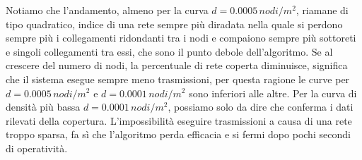 Notiamo che l'andamento, almeno per la curva $d=0.0005\, nodi/m^2$, riamane di tipo quadratico, indice di una rete sempre più diradata nella quale si perdono sempre più i collegamenti ridondanti tra i nodi e compaiono sempre più sottoreti e singoli collegamenti tra essi, che sono il punto debole dell'algoritmo. Se al crescere del numero di nodi, la percentuale di rete coperta diminuisce, significa che il sistema esegue sempre meno trasmissioni, per questa ragione le curve per $d=0.0005\, nodi/m^2$ e $d=0.0001\, nodi/m^2$ sono inferiori alle altre. Per la curva di densità più bassa $d=0.0001\, nodi/m^2$, possiamo solo da dire che conferma i dati rilevati della copertura. L'impossibilità eseguire trasmissioni a causa di una rete troppo sparsa, fa sì che l'algoritmo perda efficacia e si fermi dopo pochi secondi di operatività.

